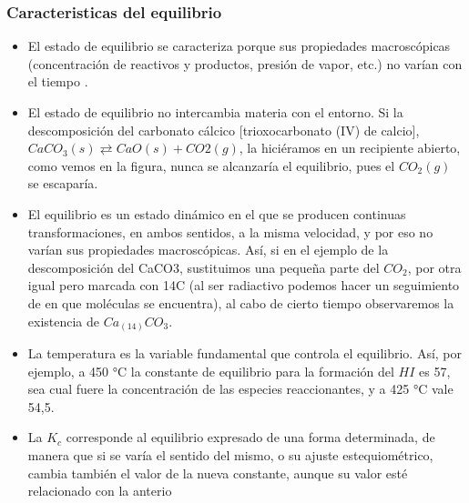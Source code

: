 \documentclass[11pt]{article}
\begin{document}
    \subsubsection{Caracteristicas del equilibrio}
        \begin{itemize}
            \item  El estado de equilibrio se caracteriza porque sus propiedades macroscópicas (concentración 
            de reactivos y productos, presión de vapor, etc.) no varían con el tiempo \cite{bier}.
            \item  El estado de equilibrio no intercambia materia con el entorno. Si la descomposición del carbonato cálcico [trioxocarbonato (IV) de calcio], $CaCO_3 (s) \rightleftarrows  CaO (s) + CO2 (g)$, la hiciéramos en un recipiente abierto, como vemos en la figura, nunca se alcanzaría el 
            equilibrio, pues el $CO_2(g)$ se escaparía.
            \item  El equilibrio es un estado dinámico en el que se producen continuas transformaciones, en ambos sentidos, a la misma velocidad, y por eso no varían sus propiedades macroscópicas. Así, si en el ejemplo de la descomposición del CaCO3, sustituimos una pequeña parte del $CO_2$, por otra igual pero marcada con 14C (al ser radiactivo podemos hacer un seguimiento de en que moléculas se encuentra), al cabo de cierto tiempo observaremos la existencia de $Ca_(14)CO_3$.
            \item La temperatura es la variable fundamental que controla el equilibrio. Así, por ejemplo, a 450 °C la constante de equilibrio para la formación del $HI$ es 57, sea cual fuere la concentración de las especies reaccionantes, y a 425 °C vale 54,5.
            \item La $K_c$ corresponde al equilibrio expresado de una forma determinada, de manera que si se varía el sentido del mismo, o su ajuste estequiométrico, cambia también el valor de la nueva constante, aunque su valor esté relacionado con la anterio
        \end{itemize}
\end{document}
